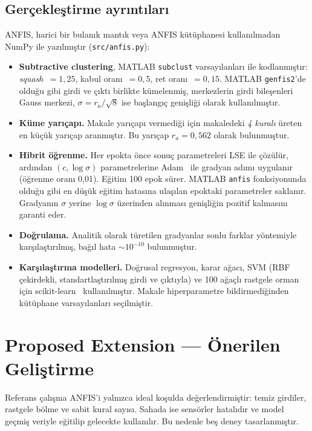 \documentclass[11pt,a4paper]{article}
\begin{document}
\subsection{Gerçekleştirme ayrıntıları}
ANFIS, harici bir bulanık mantık veya ANFIS kütüphanesi kullanılmadan NumPy ile yazılmıştır (\texttt{src/anfis.py}):
\begin{itemize}
\item \textbf{Subtractive clustering}, MATLAB \texttt{subclust} varsayılanları ile kodlanmıştır: \emph{squash}~$=1{,}25$, kabul oranı~$=0{,}5$, ret oranı~$=0{,}15$. MATLAB \texttt{genfis2}'de olduğu gibi girdi ve çıktı birlikte kümelenmiş, merkezlerin girdi bileşenleri Gauss merkezi, $\sigma=r_a/\sqrt{8}$ ise başlangıç genişliği olarak kullanılmıştır.
\item \textbf{Küme yarıçapı.} Makale yarıçapı vermediği için makaledeki \emph{4 kuralı} üreten en küçük yarıçap aranmıştır. Bu yarıçap $r_a=0{,}562$ olarak bulunmuştur.
\item \textbf{Hibrit öğrenme.} Her epokta önce sonuç parametreleri LSE ile çözülür, ardından $(c,\log\sigma)$ parametrelerine Adam~\cite{kingma2015} ile gradyan adımı uygulanır (öğrenme oranı 0,01). Eğitim 100 epok sürer. MATLAB \texttt{anfis} fonksiyonunda olduğu gibi en düşük eğitim hatasına ulaşılan epoktaki parametreler saklanır. Gradyanın $\sigma$ yerine $\log\sigma$ üzerinden alınması genişliğin pozitif kalmasını garanti eder.
\item \textbf{Doğrulama.} Analitik olarak türetilen gradyanlar sonlu farklar yöntemiyle karşılaştırılmış, bağıl hata $\sim\!10^{-10}$ bulunmuştur.
\item \textbf{Karşılaştırma modelleri.} Doğrusal regresyon, karar ağacı, SVM (RBF çekirdekli, standartlaştırılmış girdi ve çıktıyla) ve 100 ağaçlı rastgele orman için scikit-learn~\cite{pedregosa2011} kullanılmıştır. Makale hiperparametre bildirmediğinden kütüphane varsayılanları seçilmiştir.
\end{itemize}

\section{Proposed Extension — Önerilen Geliştirme}

Referans çalışma ANFIS'i yalnızca ideal koşulda değerlendirmiştir: temiz girdiler, rastgele bölme ve sabit kural sayısı. Sahada ise sensörler hatalıdır ve model geçmiş veriyle eğitilip gelecekte kullanılır. Bu nedenle beş deney tasarlanmıştır.
\end{document}
